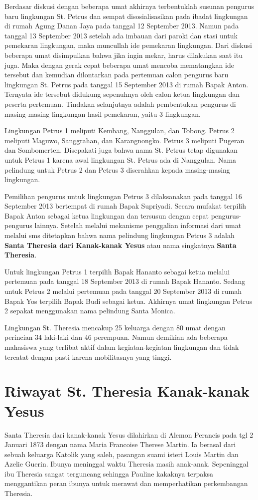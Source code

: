 Berdasar diskusi dengan beberapa umat akhirnya terbentuklah susunan pengurus baru lingkungan St. Petrus dan sempat disosialisasikan pada ibadat lingkungan di rumah Agung Danan Jaya pada tanggal 12 September 2013. Namun pada tanggal 13 September 2013 setelah ada imbauan dari paroki dan stasi untuk pemekaran lingkungan, maka muncullah ide pemekaran lingkungan. Dari diskusi beberapa umat disimpulkan bahwa jika ingin mekar, harus dilakukan saat itu juga. Maka dengan gerak cepat beberapa umat mencoba mematangkan ide tersebut dan kemudian dilontarkan pada pertemuan calon pengurus baru lingkungan St. Petrus pada tanggal 15 September 2013 di rumah Bapak Anton. Ternyata ide tersebut didukung sepenuhnya oleh calon ketua lingkungan dan peserta pertemuan. Tindakan selanjutnya adalah pembentukan pengurus di masing-masing lingkungan hasil pemekaran, yaitu 3 lingkungan. 

Lingkungan Petrus 1 meliputi Kembang, Nanggulan, dan Tobong. Petrus 2 meliputi Maguwo, Sanggrahan, dan Karangnongko. Petrus 3 meliputi Pugeran dan Sombomerten. Disepakati juga bahwa nama St. Petrus tetap digunakan untuk Petrus 1 karena awal lingkungan St. Petrus ada di Nanggulan. Nama pelindung untuk Petrus 2 dan Petrus 3 diserahkan kepada masing-masing lingkungan.

Pemilihan pengurus untuk lingkungan Petrus 3 dilaksanakan pada tanggal 16 September 2013 bertempat di rumah Bapak Supriyadi. Secara mufakat terpilih Bapak Anton sebagai ketua lingkungan dan tersusun dengan cepat pengurus-pengurus lainnya. Setelah melalui mekanisme penggalian informasi dari umat melalui sms ditetapkan bahwa nama pelindung lingkungan Petrus 3 adalah \textbf{Santa Theresia dari Kanak-kanak Yesus} atau nama singkatnya \textbf{Santa Theresia}.

Untuk lingkungan Petrus 1 terpilih Bapak Hananto sebagai ketua melalui pertemuan pada tanggal 18 September 2013 di rumah Bapak Hananto. Sedang untuk Petrus 2 melalui pertemuan pada tanggal 20 September 2013 di rumah Bapak Yos terpilih Bapak Budi sebagai ketua. Akhirnya umat lingkungan Petrus 2 sepakat menggunakan nama pelindung Santa Monica.

Lingkungan St. Theresia mencakup 25 keluarga dengan 80 umat dengan perincian 34 laki-laki dan 46 perempuan. Namun demikian ada beberapa mahasiswa yang terlibat aktif dalam kegiatan-kegiatan lingkungan dan tidak tercatat dengan pasti karena mobilitasnya yang tinggi.

\section{Riwayat St. Theresia Kanak-kanak Yesus}
Santa Theresia dari kanak-kanak Yesus dilahirkan di Alemon Perancis pada tgl 2 Januari 1873 dengan nama Maria Francoise Therese Martin. Ia berasal dari sebuah keluarga Katolik yang saleh, pasangan suami isteri Louis Martin dan Azelie Guerin. Ibunya meninggal waktu Theresia masih anak-anak. Sepeninggal ibu Theresia sangat terguncang sehingga Pauline kakaknya terpaksa menggantikan peran ibunya untuk merawat dan memperhatikan perkembangan Theresia.

